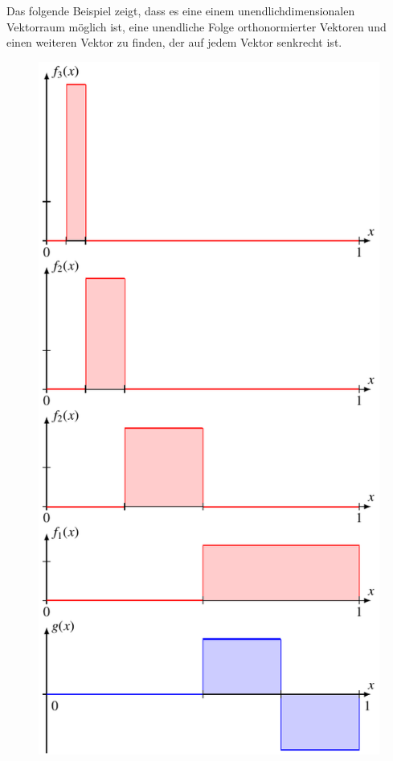 Das folgende Beispiel zeigt, dass es eine einem unendlichdimensionalen
Vektorraum möglich ist, eine unendliche Folge orthonormierter Vektoren
und einen weiteren Vektor zu finden, der auf jedem Vektor senkrecht ist.

\begin{beispiel}
\label{geometrie:l2-beispiel}
\begin{figure}
\centering
\includegraphics{chapters/1-geometrie/images/l2orth.pdf}

\end{figure}
\end{beispiel}
